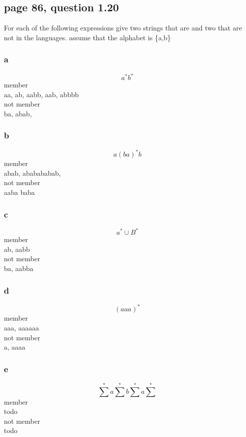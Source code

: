 \documentclass[a4paper,10pt,titlepage]{report}
\begin{document}
\subsection{page 86, question 1.20}
For each of the following expressions give two strings that are and two that are not in the languages. assume that the alphabet is \{a,b\}
\begin{multicols}{2}
\subsubsection{a}
\begin{equation}
a^*b^*
\end{equation}
member\\
aa, ab, aabb, aab, abbbb\\
not member\\
ba, abab, \\
\subsubsection{b}
\begin{equation}
a(ba)^*b
\end{equation}
member\\
abab, ababababab,\\
not member\\
aaba baba\\
\subsubsection{c}
\begin{equation}
a^* \cup B^*
\end{equation}
member\\
ab, aabb \\
not member \\
ba, aabba\\
\subsubsection{d}
\begin{equation}
(aaa)^*
\end{equation}
member\\
aaa, aaaaaa \\
not member\\
a, aaaa\\
\subsubsection{e}
\begin{equation}
\sum^*a\sum^*b\sum^*a\sum^*
\end{equation}
member\\
todo\\
not member\\
todo\\

\end{multicols}
\end{document}
